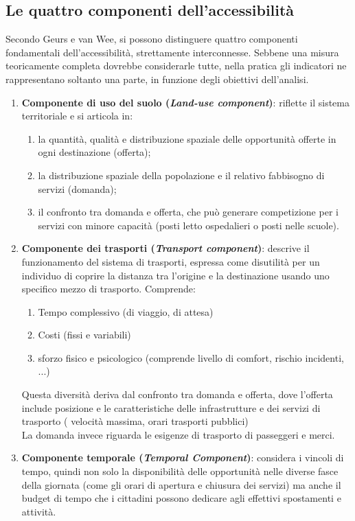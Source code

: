 \subsection{Le quattro componenti dell'accessibilità}
Secondo Geurs e van Wee, si possono distinguere quattro componenti fondamentali dell'accessibilità, strettamente interconnesse.
Sebbene una misura teoricamente completa dovrebbe considerarle tutte, nella pratica gli indicatori ne rappresentano soltanto una parte, in funzione degli obiettivi dell'analisi.
\begin{enumerate}
    \item \textbf{Componente di uso del suolo (\textit{Land-use component})}: riflette il sistema territoriale e si articola in:
    \begin{enumerate}
        \item la quantità, qualità e distribuzione spaziale delle opportunità offerte in ogni destinazione (offerta);
        \item la distribuzione spaziale della popolazione e il relativo fabbisogno di servizi (domanda);
        \item il confronto tra domanda e offerta, che può generare competizione per i servizi con minore capacità (posti letto ospedalieri o posti nelle scuole).
    \end{enumerate}
    \item \textbf{Componente dei trasporti (\textit{Transport component})}: descrive il funzionamento del sistema di trasporti, espressa come disutilità per un individuo di coprire la distanza tra l'origine e la destinazione usando uno specifico mezzo di trasporto. Comprende:
     \begin{enumerate}
        \item Tempo complessivo (di viaggio, di attesa)
        \item Costi (fissi e variabili)
        \item sforzo fisico e psicologico (comprende livello di comfort, rischio incidenti, ...)
    \end{enumerate}
        Questa diversità deriva dal confronto tra domanda e offerta, dove l'offerta include posizione e le caratteristiche delle infrastrutture e dei servizi di trasporto ( velocità massima, orari trasporti pubblici)\\
        La domanda invece riguarda le esigenze di trasporto di passeggeri e merci. 
    \item \textbf{Componente temporale (\textit{Temporal Component})}: considera i vincoli di tempo, quindi non solo la disponibilità delle opportunità nelle diverse fasce della giornata (come gli orari di apertura e chiusura dei servizi) ma anche il budget di tempo che i cittadini possono dedicare agli effettivi spostamenti e attività.
    

\end{enumerate}
